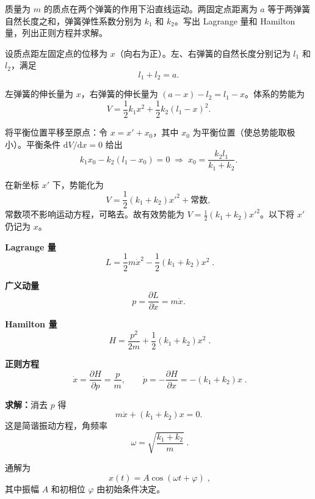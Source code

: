 \begin{question}
质量为 \(m\) 的质点在两个弹簧的作用下沿直线运动。两固定点距离为 \(a\) 等于两弹簧自然长度之和，弹簧弹性系数分别为 \(k_1\) 和 \(k_2\)。写出 Lagrange 量和 Hamilton 量，列出正则方程并求解。

\begin{solution}
设质点距左固定点的位移为 \(x\)（向右为正）。左、右弹簧的自然长度分别记为 \(l_1\) 和 \(l_2\)，满足
\[
l_1 + l_2 = a .
\]

左弹簧的伸长量为 \(x\)，右弹簧的伸长量为 \((a - x) - l_2 = l_1 - x\)。体系的势能为
\[
V = \frac12 k_1 x^2 + \frac12 k_2 (l_1 - x)^2 .
\]

将平衡位置平移至原点：令 \(x = x' + x_0\)，其中 \(x_0\) 为平衡位置（使总势能取极小）。平衡条件 \(\mathrm d V/\mathrm d x = 0\) 给出
\[
k_1 x_0 - k_2 (l_1 - x_0) = 0 \;\Longrightarrow\; x_0 = \frac{k_2 l_1}{k_1 + k_2}.
\]

在新坐标 \(x'\) 下，势能化为
\[
V = \frac12 (k_1 + k_2) x'^2 + \text{常数},
\]
常数项不影响运动方程，可略去。故有效势能为 \(V = \frac12(k_1 + k_2)x'^2\)。以下将 \(x'\) 仍记为 \(x\)。

\textbf{Lagrange 量}
\[
\boxed{\;L = \frac12 m\dot x^2 - \frac12 (k_1 + k_2) x^2\;}.
\]

\textbf{广义动量}
\[
p = \frac{\partial L}{\partial\dot x} = m\dot x .
\]

\textbf{Hamilton 量}
\[
\boxed{\;H = \frac{p^2}{2m} + \frac12 (k_1 + k_2) x^2\;}.
\]

\textbf{正则方程}
\[
\boxed{\;\dot x = \frac{\partial H}{\partial p} = \frac{p}{m},\qquad
\dot p = -\frac{\partial H}{\partial x} = -(k_1 + k_2)x\;}.
\]

\textbf{求解：}消去 \(p\) 得
\[
m\ddot x + (k_1 + k_2)x = 0 .
\]
这是简谐振动方程，角频率
\[
\boxed{\;\omega = \sqrt{\frac{k_1 + k_2}{m}}\;}.
\]

通解为
\[
\boxed{\;x(t) = A\cos(\omega t + \varphi)\;},
\]
其中振幅 \(A\) 和初相位 \(\varphi\) 由初始条件决定。
\end{solution}
\end{question}


